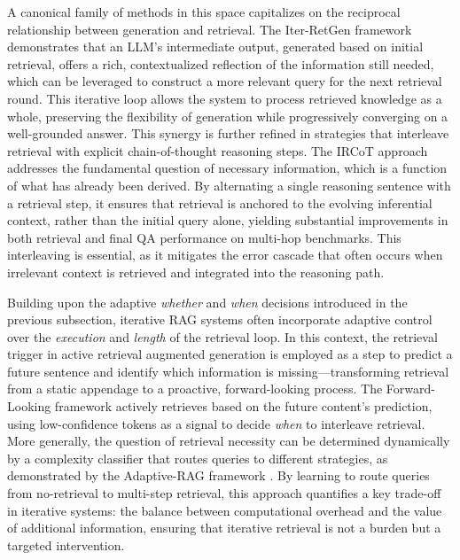 \documentclass[11pt,a4paper]{article}
\begin{document}
A canonical family of methods in this space capitalizes on the reciprocal relationship between generation and retrieval. The Iter-RetGen framework \cite{arxiv:2305.15294v2} demonstrates that an LLM's intermediate output, generated based on initial retrieval, offers a rich, contextualized reflection of the information still needed, which can be leveraged to construct a more relevant query for the next retrieval round. This iterative loop allows the system to process retrieved knowledge as a whole, preserving the flexibility of generation while progressively converging on a well-grounded answer. This synergy is further refined in strategies that interleave retrieval with explicit chain-of-thought reasoning steps. The IRCoT approach \cite{arxiv:2212.10509v2} addresses the fundamental question of necessary information, which is a function of what has already been derived. By alternating a single reasoning sentence with a retrieval step, it ensures that retrieval is anchored to the evolving inferential context, rather than the initial query alone, yielding substantial improvements in both retrieval and final QA performance on multi-hop benchmarks. This interleaving is essential, as it mitigates the error cascade that often occurs when irrelevant context is retrieved and integrated into the reasoning path.

Building upon the adaptive \emph{whether} and \emph{when} decisions introduced in the previous subsection, iterative RAG systems often incorporate adaptive control over the \emph{execution} and \emph{length} of the retrieval loop. In this context, the retrieval trigger in active retrieval augmented generation \cite{arxiv:2305.06983v2} is employed as a step to predict a future sentence and identify which information is missing---transforming retrieval from a static appendage to a proactive, forward-looking process. The Forward-Looking framework actively retrieves based on the future content's prediction, using low-confidence tokens as a signal to decide \emph{when} to interleave retrieval. More generally, the question of retrieval necessity can be determined dynamically by a complexity classifier that routes queries to different strategies, as demonstrated by the Adaptive-RAG framework \cite{arxiv:2403.14403v2}. By learning to route queries from no-retrieval to multi-step retrieval, this approach quantifies a key trade-off in iterative systems: the balance between computational overhead and the value of additional information, ensuring that iterative retrieval is not a burden but a targeted intervention.
\end{document}
